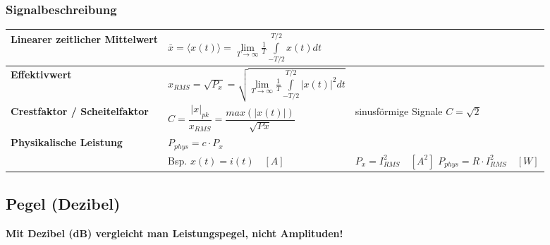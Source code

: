 		\subsubsection{Signalbeschreibung}
			\begin{tabular}{p{4cm} p{7cm} p{7cm}}
				\hline
				\textbf{Linearer zeitlicher Mittelwert} & 
				$\bar{x}=\langle x(t)\rangle = \lim \limits_{T \to \infty} {\frac{1}{T} \int\limits_{-T/2}^{T/2} {x(t) dt}} $\\ \hline
				
				
				\textbf{Effektivwert}&
				$x_{RMS} = \sqrt{P_x} = \sqrt{\lim \limits_{T \to \infty} {\frac{1}{T} \int\limits_{-T/2}^{T/2} {|x(t)|^2 dt}}}$\\\hline
				
				\textbf{Crestfaktor / Scheitelfaktor} & 
				$C = \dfrac{|x|_{pk}}{x_{RMS}} = \dfrac{max(|x(t)|)}{\sqrt{Px}}$ &
				sinusförmige Signale $C = \sqrt{2}$\\\hline
				
				
				\textbf{Physikalische Leistung} &
				$P_{phys} = c \cdot P_x$\\
				& Bsp. $x(t) = i(t) \quad [A]$&
				$P_x = I_{RMS}^2 \quad [A^2]$ \qquad
				$P_{phys} = R \cdot I_{RMS}^2 \quad [W]$\\
				\hline
			\end{tabular}
			 
			

	\subsection{Pegel (Dezibel)}
		\textbf{Mit Dezibel (dB) vergleicht man Leistungspegel, nicht Amplituden!}
		
